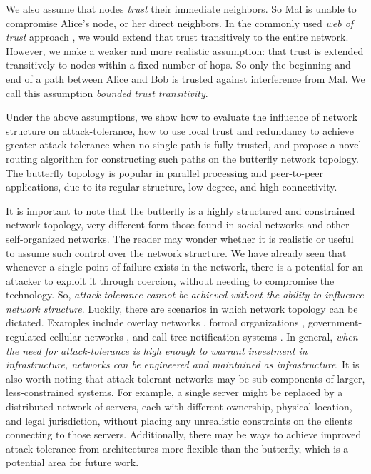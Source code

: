 \documentclass[sigconf]{acmart}
\begin{document}
We also assume that nodes {\em trust} their immediate neighbors.
So Mal is unable to compromise Alice's node, or her direct neighbors.
In the commonly used {\em web of trust} approach
\cite{zimmermann_official_1995,ferguson_practical_2003},
we would extend that trust transitively to the entire network.
However, we make a weaker and more realistic assumption:
that trust is extended transitively to nodes within a fixed
number of hops.
So only the beginning and end of a path between Alice and Bob is trusted
against interference from Mal.
We call this assumption
{\em bounded trust transitivity}.

Under the above assumptions,
we show how to evaluate the influence of network structure
on attack-tolerance,
how to use local trust and redundancy to achieve greater attack-tolerance
when no single path is fully trusted,
and propose a novel routing algorithm for constructing such paths on
the butterfly network topology.
The butterfly topology is popular in parallel processing
\cite{kshemkalyani_distributed_2008} and
peer-to-peer \cite{lua_survey_2005, korzun_structured_2013}
applications, due to its regular structure, low degree, and high connectivity.

It is important to note that the butterfly is a highly structured and constrained
network topology,
very different form those found in social networks and other
self-organized networks.
The reader may wonder whether it is realistic or useful to assume such control over
the network structure.
We have already seen that whenever a single point of failure exists in the network,
there is a potential for an attacker to exploit it through coercion,
without needing to compromise the technology.
So, {\em attack-tolerance cannot be achieved without the ability to influence
network structure}.
Luckily, there are scenarios in which network topology can be dictated.
Examples include overlay networks
\cite{lua_survey_2005, korzun_structured_2013},
formal organizations \cite{mohr_explaining_1982},
government-regulated cellular networks \cite{walker_mass_2012},
and call tree notification systems \cite{nickerson_thinking_2010}.
In general,
{\em when the need for attack-tolerance is high enough to warrant investment
in infrastructure, networks can be engineered and maintained as infrastructure}.
It is also worth noting that attack-tolerant networks may be sub-components of
larger, less-constrained systems.
For example, a single server might be replaced by a distributed network of servers,
each with different ownership, physical location, and legal jurisdiction,
without placing any unrealistic constraints on the clients connecting to
those servers.
Additionally, there may be ways to achieve improved attack-tolerance from architectures
more flexible than the butterfly, which is a potential area for future work.
\end{document}
